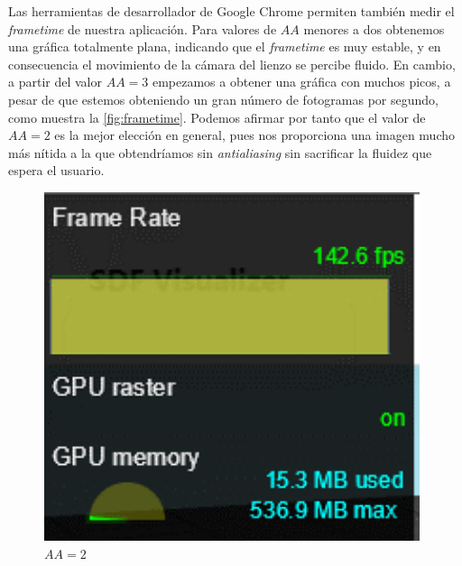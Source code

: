 Las herramientas de desarrollador de Google Chrome permiten también medir el \textit{frametime} de nuestra aplicación. Para valores de $AA$ menores a dos obtenemos una gráfica totalmente plana, indicando que el \textit{frametime} es muy estable, y en consecuencia el movimiento de la cámara del lienzo se percibe fluido. En cambio, a partir del valor $AA=3$ empezamos a obtener una gráfica con muchos picos, a pesar de que estemos obteniendo un gran número de fotogramas por segundo, como muestra la \autoref{fig:frametime}. Podemos afirmar por tanto que el valor de $AA=2$ es la mejor elección en general, pues nos proporciona una imagen mucho más nítida a la que obtendríamos sin \textit{antialiasing} sin sacrificar la fluidez que espera el usuario.\newline
\begin{figure}[!h]
     \begin{minipage}[c]{0.4\linewidth}
        \centering
        \includegraphics[width=0.98\textwidth]{Plantilla-TFG-master/img/graficas/frametimeG.png}
        \caption{$AA=2$}
     \end{minipage}
     \hfill
     \begin{minipage}[c]{0.4\linewidth}
        \centering

\end{minipage}
\end{figure}
